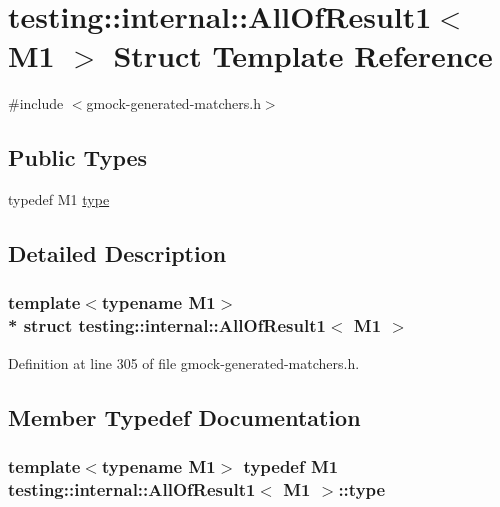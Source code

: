 \hypertarget{structtesting_1_1internal_1_1_all_of_result1}{}\section{testing\+:\+:internal\+:\+:All\+Of\+Result1$<$ M1 $>$ Struct Template Reference}
\label{structtesting_1_1internal_1_1_all_of_result1}


{\ttfamily \#include $<$gmock-\/generated-\/matchers.\+h$>$}

\subsection*{Public Types}
\begin{DoxyCompactItemize}
\item 
typedef M1 \hyperlink{structtesting_1_1internal_1_1_all_of_result1_a19b95d4ddf7f4044a78665d9e253db10}{type}
\end{DoxyCompactItemize}


\subsection{Detailed Description}
\subsubsection*{template$<$typename M1$>$\\*
struct testing\+::internal\+::\+All\+Of\+Result1$<$ M1 $>$}



Definition at line 305 of file gmock-\/generated-\/matchers.\+h.



\subsection{Member Typedef Documentation}
\subsubsection[{\texorpdfstring{type}{type}}]{\setlength{\rightskip}{0pt plus 5cm}template$<$typename M1$>$ typedef M1 {\bf testing\+::internal\+::\+All\+Of\+Result1}$<$ M1 $>$\+::{\bf type}}\hypertarget{structtesting_1_1internal_1_1_all_of_result1_a19b95d4ddf7f4044a78665d9e253db10}{}\label{structtesting_1_1internal_1_1_all_of_result1_a19b95d4ddf7f4044a78665d9e253db10}


